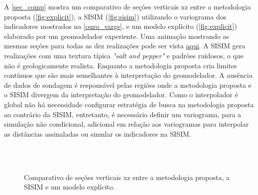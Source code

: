 A \autoref{sec_comp} mostra um comparativo de seções verticais xz entre a metodologia proposta (\autoref{fig:explicit}), a SISIM (\autoref{fig:sisim}) utilizando o variograma dos indicadores mostrados na \autoref{ouro_vargs}, e um modelo explícito (\autoref{fig:explicit}) elaborado por um geomodelador experiente. Uma animação mostrando as mesmas seções para todas as dez realizações pode ser vista \href{https://github.com/robertorolo/assessing_geological_model_uncertainty_with_probability_fields/blob/main/ezgif-2-802d466feae1.gif}{aqui}. A SISIM gera realizações com uma textura típica \textit{"salt and pepper"} e padrões ruidosos, o que não é geologicamente realista. Enquanto a metodologia proposta cria limites contínuos que são mais semelhantes à interpretação do geomodelador. A ausência de dados de sondagem é responsável pelas regiões onde a metodologia proposta e o SISIM divergem da interpretação do geomodelador. Como o interpolador é global não há necessidade configurar estratégia de busca na metodologia proposta ao contrário da SISIM, entretanto, é necessário definir um variograma, para a simulação não condicional, adicional em relação aos variogramas para interpolar as distâncias assinaladas ou simular os indicadores na SISIM.


\begin{figure}[H]
    \caption{Comparativo de seções verticais xz entre a metodologia proposta, a SISIM e um modelo explícito.} \label{sec_comp}
     \centering
     \\
     \\
\end{figure}

